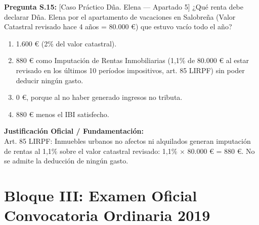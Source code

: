 \documentclass[11pt,a4paper,openany]{article}
\begin{document}
\noindent\textbf{\sffamily Pregunta S.15:} [Caso Práctico Dña. Elena — Apartado 5] ¿Qué renta debe declarar Dña. Elena por el apartamento de vacaciones en Salobreña (Valor Catastral revisado hace 4 años = 80.000 \euro{}) que estuvo vacío todo el año?\\[0.15cm]
\begin{enumerate}[label=\textbf{\alph*)},leftmargin=1.8em,itemsep=1.5pt,topsep=2pt,partopsep=0pt,parsep=0pt]
    \item 1.600 \euro{} (2\% del valor catastral).
    \item 880 \euro{} como Imputación de Rentas Inmobiliarias (1,1\% de 80.000 \euro{} al estar revisado en los últimos 10 períodos impositivos, art. 85 LIRPF) sin poder deducir ningún gasto.
    \item 0 \euro{}, porque al no haber generado ingresos no tributa.
    \item 880 \euro{} menos el IBI satisfecho.
\end{enumerate}
\begin{solucionBox}
\textbf{Justificación Oficial / Fundamentación:}\\[0.1cm]
Art. 85 LIRPF: Inmuebles urbanos no afectos ni alquilados generan imputación de rentas al 1,1\% sobre el valor catastral revisado: 1,1\% $\times$  80.000 \euro{} = 880 \euro{}. No se admite la deducción de ningún gasto.
\end{solucionBox}
\vspace{0.35cm}

\newpage
\section{Bloque III: Examen Oficial Convocatoria Ordinaria 2019}
\label{sec:examen2019}
\end{document}
